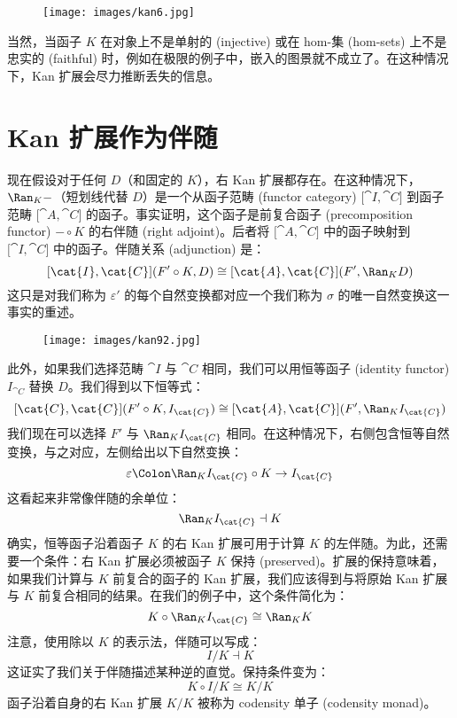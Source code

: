 \begin{figure}[H]
  \centering
  \texttt{[image: images/kan6.jpg]}
\end{figure}

\noindent
当然，当函子 $K$ 在对象上不是单射的 (injective) 或在 hom-集 (hom-sets) 上不是忠实的 (faithful) 时，例如在极限的例子中，嵌入的图景就不成立了。在这种情况下，Kan 扩展会尽力推断丢失的信息。

\section{Kan 扩展作为伴随}

现在假设对于任何 $D$（和固定的 $K$），右 Kan 扩展都存在。在这种情况下，$\Ran_{K}-$（短划线代替 $D$）是一个从函子范畴 (functor category) ${[}\cat{I}, \cat{C}{]}$ 到函子范畴 ${[}\cat{A}, \cat{C}{]}$ 的函子。事实证明，这个函子是前复合函子 (precomposition functor) $- \circ K$ 的右伴随 (right adjoint)。后者将 ${[}\cat{A}, \cat{C}{]}$ 中的函子映射到 ${[}\cat{I}, \cat{C}{]}$ 中的函子。伴随关系 (adjunction) 是：
\[[\cat{I}, \cat{C}](F' \circ K, D) \cong [\cat{A}, \cat{C}](F', \Ran_{K}D)\]
这只是对我们称为 $\varepsilon'$ 的每个自然变换都对应一个我们称为 $\sigma$ 的唯一自然变换这一事实的重述。

\begin{figure}[H]
  \centering
  \texttt{[image: images/kan92.jpg]}
\end{figure}

\noindent
此外，如果我们选择范畴 $\cat{I}$ 与 $\cat{C}$ 相同，我们可以用恒等函子 (identity functor) $I_{\cat{C}}$ 替换 $D$。我们得到以下恒等式：
\[[\cat{C}, \cat{C}](F' \circ K, I_{\cat{C}}) \cong [\cat{A}, \cat{C}](F', \Ran_{K}I_{\cat{C}})\]
我们现在可以选择 $F'$ 与 $\Ran_{K}I_{\cat{C}}$ 相同。在这种情况下，右侧包含恒等自然变换，与之对应，左侧给出以下自然变换：
\[\varepsilon \Colon \Ran_{K}I_{\cat{C}} \circ K \to I_{\cat{C}}\]
这看起来非常像伴随的余单位：
\[\Ran_{K}I_{\cat{C}} \dashv K\]
确实，恒等函子沿着函子 $K$ 的右 Kan 扩展可用于计算 $K$ 的左伴随。为此，还需要一个条件：右 Kan 扩展必须被函子 $K$ 保持 (preserved)。扩展的保持意味着，如果我们计算与 $K$ 前复合的函子的 Kan 扩展，我们应该得到与将原始 Kan 扩展与 $K$ 前复合相同的结果。在我们的例子中，这个条件简化为：
\[K \circ \Ran_{K}I_{\cat{C}} \cong \Ran_{K}K\]
注意，使用除以 $K$ 的表示法，伴随可以写成：
\[I/K \dashv K\]
这证实了我们关于伴随描述某种逆的直觉。保持条件变为：
\[K \circ I/K \cong K/K\]
函子沿着自身的右 Kan 扩展 $K/K$ 被称为 codensity 单子 (codensity monad)。

